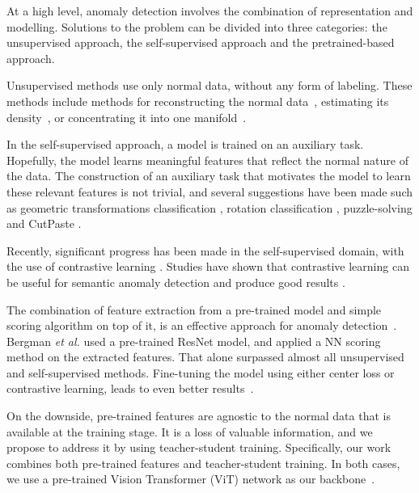 \documentclass[10pt,twocolumn,letterpaper]{article}
\begin{document}
At a high level, anomaly detection involves the combination of representation and modelling. Solutions to the problem can be divided into three categories: the unsupervised approach, the self-supervised approach and the pretrained-based approach. 


Unsupervised methods use only normal data, without any form of labeling. These methods include methods for reconstructing the normal data~\cite{eskin2002geometric, xia2015learning, zenati2018efficient, li2018anomaly, deecke2018image}, estimating its density~\cite{glodek2013ensemble}, or concentrating it into one manifold~\cite{Ruff2018deep, scholkopf1999support, tax2004support}. 


In the self-supervised approach, a model is trained on an auxiliary task. Hopefully, the model learns meaningful features that reflect the normal nature of the data. The construction of an auxiliary task that motivates the model to learn these relevant features is not trivial, and several suggestions have been made such as geometric transformations classification \cite{golan2018deep}, rotation classification \cite{hendrycks2019using}, puzzle-solving \cite{salehi2020puzzle} and CutPaste \cite{li2021cutpaste}. 
 

Recently, significant progress has been made in the self-supervised domain, with the use of contrastive learning \cite{thulasidasan2020simple,he2020momentum,grill2020bootstrap}. Studies have shown that contrastive learning can be useful for semantic anomaly detection and produce good results \cite{tack2020csi, sohn2020learning}. 

The combination of feature extraction from a pre-trained model and simple scoring algorithm on top of it, is an effective approach for anomaly detection~\cite{bergman2020deep, hendrycks2019using, xiao2021we}. Bergman \textit{et al.} \cite{bergman2020deep} used a pre-trained ResNet model, and applied a NN scoring method on the extracted features. That alone surpassed almost all unsupervised and self-supervised methods. Fine-tuning the model using either center loss or contrastive learning, leads to even better results~\cite{reiss2020panda,reiss2021mean}. 

On the downside, pre-trained features are agnostic to the normal data that is available at the training stage. It is a loss of valuable information, and we propose to address it by using teacher-student training. Specifically, our work combines both pre-trained features and teacher-student training. In both cases, we use a pre-trained Vision Transformer (ViT) network as our backbone~\cite{dosovitskiy2020image}. 
\end{document}
